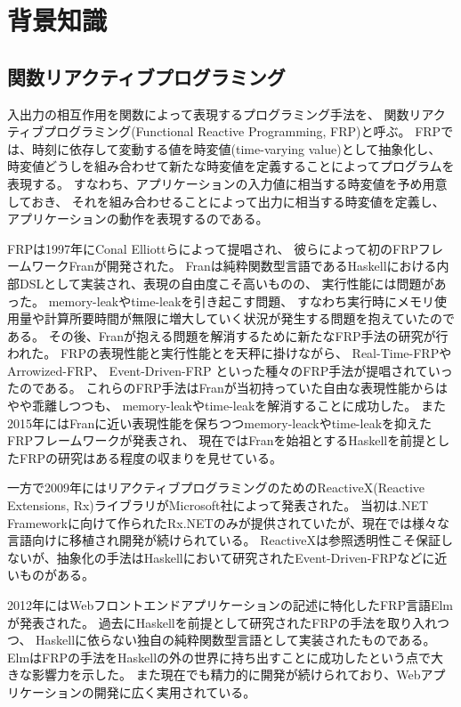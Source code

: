 \chapter{背景知識}
\section{関数リアクティブプログラミング}
入出力の相互作用を関数によって表現するプログラミング手法を、
関数リアクティブプログラミング(Functional Reactive Programming, FRP)と呼ぶ。
FRPでは、時刻に依存して変動する値を時変値(time-varying value)として抽象化し、
時変値どうしを組み合わせて新たな時変値を定義することによってプログラムを表現する。
すなわち、アプリケーションの入力値に相当する時変値を予め用意しておき、
それを組み合わせることによって出力に相当する時変値を定義し、アプリケーションの動作を表現するのである。

FRPは1997年にConal Elliott\cite{elliott1997functional}らによって提唱され、
彼らによって初のFRPフレームワークFranが開発された。
Franは純粋関数型言語であるHaskellにおける内部DSLとして実装され、表現の自由度こそ高いものの、
実行性能には問題があった。
memory-leakやtime-leakを引き起こす問題、
すなわち実行時にメモリ使用量や計算所要時間が無限に増大していく状況が発生する問題を抱えていたのである。
その後、Franが抱える問題を解消するために新たなFRP手法の研究が行われた。
FRPの表現性能と実行性能とを天秤に掛けながら、
Real-Time-FRP\cite{wan2001real}やArrowized-FRP\cite{nilsson2002functional}、
Event-Driven-FRP\cite{simulinkwebsite}
といった種々のFRP手法が提唱されていったのである。
これらのFRP手法はFranが当初持っていた自由な表現性能からはやや乖離しつつも、
memory-leakやtime-leakを解消することに成功した。
また2015年にはFranに近い表現性能を保ちつつmemory-leackやtime-leakを抑えたFRPフレームワーク\cite{ploeg2015practical}が発表され、
現在ではFranを始祖とするHaskellを前提としたFRPの研究はある程度の収まりを見せている。

一方で2009年にはリアクティブプログラミングのためのReactiveX(Reactive Extensions, Rx)ライブラリがMicrosoft社によって発表された。
当初は.NET Frameworkに向けて作られたRx.NETのみが提供されていたが、現在では様々な言語向けに移植され開発が続けられている。
ReactiveXは参照透明性こそ保証しないが、抽象化の手法はHaskellにおいて研究されたEvent-Driven-FRPなどに近いものがある。

2012年にはWebフロントエンドアプリケーションの記述に特化したFRP言語Elm\cite{czaplicki2012elm,czaplicki2013asynchronous}
が発表された。
過去にHaskellを前提として研究されたFRPの手法を取り入れつつ、
Haskellに依らない独自の純粋関数型言語として実装されたものである。
ElmはFRPの手法をHaskellの外の世界に持ち出すことに成功したという点で大きな影響力を示した。
また現在でも精力的に開発が続けられており、Webアプリケーションの開発に広く実用されている。


